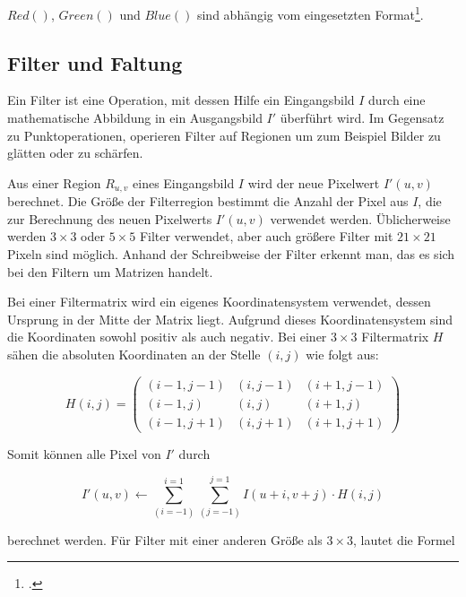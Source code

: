 $Red()$, $Green()$ und $Blue()$ sind abhängig vom eingesetzten Format\footcite[Vgl.][S.~236--237]{burger05}.

\subsection{Filter und Faltung} %
\label{sub:filter}
Ein Filter ist eine Operation, mit dessen Hilfe ein Eingangsbild $I$ durch eine mathematische Abbildung in ein
 Ausgangsbild $I'$ überführt wird. Im Gegensatz zu Punktoperationen, operieren Filter auf Regionen um zum Beispiel
 Bilder zu glätten oder zu schärfen.

Aus einer Region $R_{u,v}$ eines Eingangsbild $I$ wird der neue Pixelwert $I'(u,v)$ berechnet. Die Größe der
 Filterregion bestimmt die Anzahl der Pixel aus $I$, die zur Berechnung des neuen Pixelwerts $I'(u,v)$ verwendet
 werden. Üblicherweise werden $3 \times 3$ oder $5 \times 5$ Filter verwendet, aber auch größere Filter mit $21 \times
 21$ Pixeln sind möglich. Anhand der Schreibweise der Filter erkennt man, das es sich bei den Filtern um Matrizen
 handelt.

Bei einer Filtermatrix wird ein eigenes Koordinatensystem verwendet, dessen Ursprung in der Mitte der Matrix liegt.
 Aufgrund dieses Koordinatensystem sind die Koordinaten sowohl positiv als auch negativ. Bei einer $3 \times 3$
 Filtermatrix $H$ sähen die absoluten Koordinaten an der Stelle $(i,j)$ wie folgt aus:

\begin{equation}
	H(i,j) =
	\begin{pmatrix}
		\left(i-1, j-1\right)&	\left(i, j-1\right)&	\left(i+1, j-1\right)\\
		\left(i-1, j\right)& 	\left(i, j\right)&		\left(i+1, j\right)\\
		\left(i-1, j+1\right)&	\left(i, j+1\right)&	\left(i+1, j+1\right)
	\end{pmatrix}
\end{equation}

Somit können alle Pixel von $I'$ durch

\begin{equation}
	I'\left(u,v\right) \gets
	\sum \limits_{\left(i = -1\right)}^{i = 1}
	\sum \limits_{\left(j = -1\right)}^{j = 1}
	I\left(u + i, v + j\right) \cdot H\left(i,j\right)
\end{equation}

berechnet werden. Für Filter mit einer anderen Größe als $3 \times 3$, lautet die Formel

